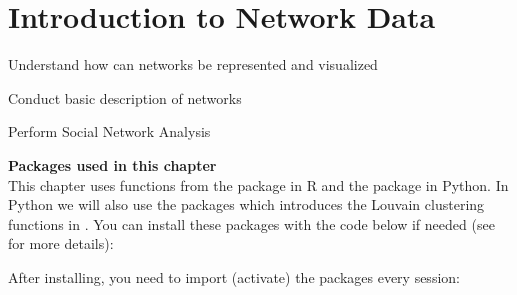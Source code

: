\chapter{Introduction to Network Data}
\label{chap:network}

\begin{abstract}{Abstract}
  
Especially social media data, but also other types of data can often be represented as networks. This chapter introduces  (R+Python) and  (Python) to showcase how to deal with such data, perform Social Network Analysis (SNA) and represent it visually. 
\end{abstract}


\begin{objectives}
\item Understand how can networks be represented and visualized
\item Conduct basic description of networks
\item Perform Social Network Analysis
\end{objectives}



\newpage
\begin{feature}
  \textbf{Packages used in this chapter}\\
  This chapter uses functions from the package  in R and the package  in Python.
  In Python we will also use the  packages which introduces the Louvain clustering functions in .
  You can install these packages with the code below if needed  (see  for more details):


\noindent After installing, you need to import (activate) the packages every session:

\end{feature}




